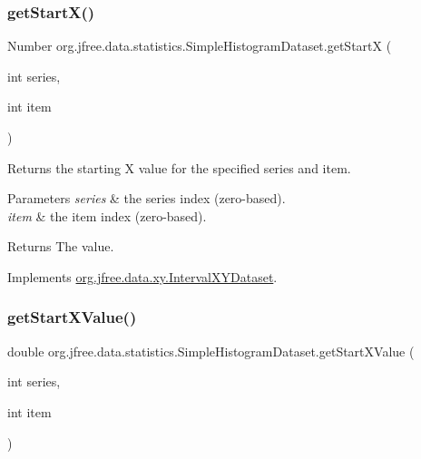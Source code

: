 \subsubsection{\texorpdfstring{get\+Start\+X()}{getStartX()}}
{\footnotesize\ttfamily Number org.\+jfree.\+data.\+statistics.\+Simple\+Histogram\+Dataset.\+get\+StartX (\begin{DoxyParamCaption}\item[{int}]{series,  }\item[{int}]{item }\end{DoxyParamCaption})}

Returns the starting X value for the specified series and item.


\begin{DoxyParams}{Parameters}
{\em series} & the series index (zero-\/based). \\
\hline
{\em item} & the item index (zero-\/based).\\
\hline
\end{DoxyParams}
\begin{DoxyReturn}{Returns}
The value. 
\end{DoxyReturn}


Implements \mbox{\hyperlink{interfaceorg_1_1jfree_1_1data_1_1xy_1_1_interval_x_y_dataset_a7548ec7d60d72463313dc6f10aceee62}{org.\+jfree.\+data.\+xy.\+Interval\+X\+Y\+Dataset}}.

\mbox{\label{classorg_1_1jfree_1_1data_1_1statistics_1_1_simple_histogram_dataset_a46053237a9d5ab27ed36a7ed0b83e537}} 
\subsubsection{\texorpdfstring{get\+Start\+X\+Value()}{getStartXValue()}}
{\footnotesize\ttfamily double org.\+jfree.\+data.\+statistics.\+Simple\+Histogram\+Dataset.\+get\+Start\+X\+Value (\begin{DoxyParamCaption}\item[{int}]{series,  }\item[{int}]{item }\end{DoxyParamCaption})}

